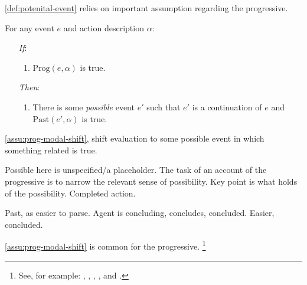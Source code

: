\begin{note}
  \autoref{def:potenital-event} relies on important assumption regarding the progressive.

  \begin{assumption}
    \label{assu:prog-modal-shift}
    For any event \(e\) and action description \(\alpha\):
    \begin{enumerate}
    \item[\emph{If}:]
      \begin{enumerate}[label=\alph*., ref=(\alph*)]
      \item
        \(\text{Prog}(e, \alpha)\) is true.
      \end{enumerate}
    \item[\emph{Then}:]
      \begin{enumerate}[label=\alph*., ref=(\alph*), resume]
      \item
        There is some \emph{possible} event \(e'\) such that \(e'\) is a continuation of \(e\) and \(\text{Past}(e',\alpha)\) is true.
      \end{enumerate}
    \end{enumerate}
    \vspace{-\baselineskip}
  \end{assumption}

  \autoref{assu:prog-modal-shift}, shift evaluation to some possible event in which something related is true.

  Possible here is unspecified/a placeholder.
  The task of an account of the progressive is to narrow the relevant sense of possibility.
  Key point is what holds of the possibility.
  Completed action.

  Past, as easier to parse.
  Agent is concluding, concludes, concluded.
  Easier, concluded.

  \autoref{assu:prog-modal-shift} is common for the progressive.%
  \footnote{
    See, for example:
    \textcite{Bennett:1972uw},
    \textcite{Dowty:1979vq},
    \textcite{Parsons:1990aa},
    \textcite{Landman:1992wh}, and
    \textcite{Portner:1998um}.

}
\end{note}
